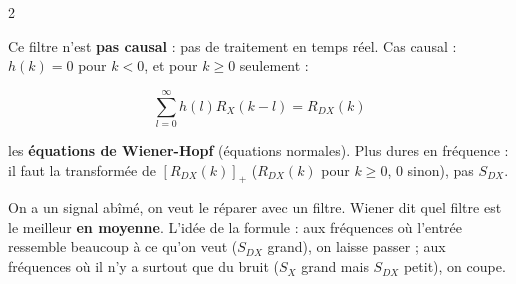 \documentclass[a4paper,9pt]{extarticle}
\begin{document}
\begin{multicols}{2}
\begin{warning}

Ce filtre n'est \textbf{pas causal} : pas de traitement en temps réel. Cas causal : $h(k) = 0$
pour $k < 0$, et pour $k\ge0$ seulement :

\[
\sum_{l=0}^\infty h(l)R_X(k-l) = R_{DX}(k)
\]

les \textbf{équations de Wiener-Hopf} (équations normales). Plus dures en fréquence : il faut la
transformée de $[R_{DX}(k)]_+$ ($R_{DX}(k)$ pour $k\ge0$, 0 sinon), pas $S_{DX}$.

\end{warning}


\begin{simple}

On a un signal abîmé, on veut le réparer avec un filtre. Wiener dit quel filtre est le
meilleur \textbf{en moyenne}. L'idée de la formule : aux fréquences où l'entrée ressemble
beaucoup à ce qu'on veut ($S_{DX}$ grand), on laisse passer ; aux fréquences où il n'y a
surtout que du bruit ($S_X$ grand mais $S_{DX}$ petit), on coupe.

\end{simple}

\end{multicols}
\end{document}
